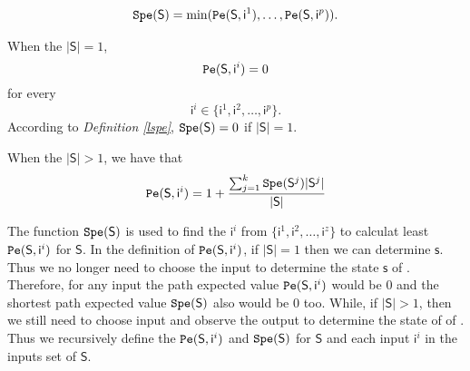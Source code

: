 \begin{definition} \label{lspe}
\begin{equation}
\begin{split}
{\tt Spe}(\mathsf{S})= \min({\tt Pe}(\mathsf{S}, \mathsf{ i}^{1}),\ldots,{\tt Pe}(\mathsf{S}, \mathsf{ i}^{p})).
\end{split}
\end{equation}
\end{definition}

\begin{definition} \label{spe}

When the $|\mathsf{S}|=1$,
\[{\tt Pe}(\mathsf{S}, \mathsf{ i}^{i})=0\]  for every \[\mathsf{ i}^{i} \in \{\mathsf{ i}^{1},\mathsf{ i}^{2},\ldots, \mathsf{ i}^{p}\}.\] According to {\em Definition \ref{lspe}}, ${\tt Spe}(\mathsf{S})=0$ if $|\mathsf{S}|=1$. 

When the $|\mathsf{S}|>1$, 
we have that  
\begin{equation}
\begin{split}
{\tt Pe}(\mathsf{S}, \mathsf{ i}^{i})=1 +\frac{\sum_{j=1}^k {\tt Spe}(\mathsf{S}^{j})|\mathsf{S}^{j}|}{ |\mathsf{S}|}
\end{split}
\end{equation}
\end{definition}

The function ${\tt Spe}(\mathsf{S})$ is used to find the $\mathsf{ i}^{i}$ from $\{\mathsf{ i}^{1},\mathsf{ i}^{2},\ldots, \mathsf{ i}^{z}\}$ to calculat least ${\tt Pe}(\mathsf{S}, \mathsf{ i}^{i})$ for $\mathsf{S}$. In the definition of ${\tt Pe}(\mathsf{S}, \mathsf{ i}^{i})$, if $|\mathsf{S}|=1$ then we can determine $\mathsf{s}$. Thus we no longer need to choose the input to determine the state $\mathsf{s}$ of \BCNs. Therefore, for any input the path expected value ${\tt Pe}(\mathsf{S}, \mathsf{ i}^{i})$ would be $0$ and the shortest path expected value ${\tt Spe}(\mathsf{S})$ also would be $0$ too. While, if $|\mathsf{S}|>1$, then we still need to choose input and observe the output to determine the state of of \BCNs. Thus we recursively define the ${\tt Pe}(\mathsf{S}, \mathsf{ i}^{i})$ and ${\tt Spe}(\mathsf{S})$ for $\mathsf{S}$ and each input $\mathsf{ i}^{i}$ in the inputs set of $\mathsf{S}$. 

